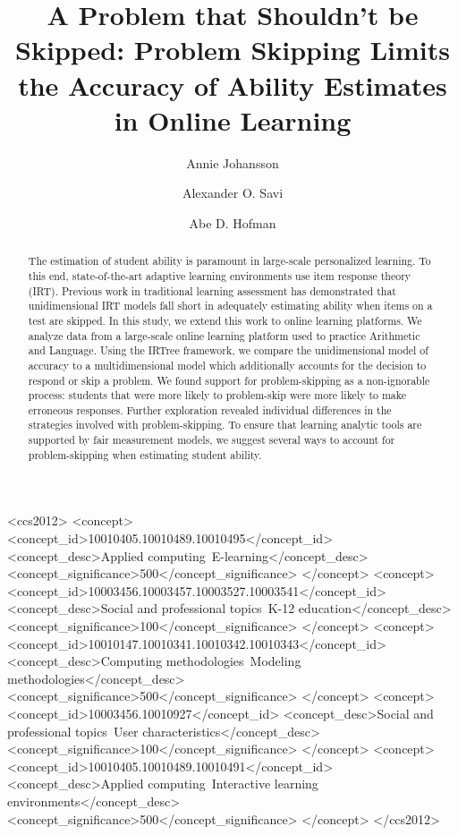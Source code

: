 \documentclass[manuscript]{acmart}
\title[Accounting for Problem-skipping in Online Learning]{A Problem that Shouldn't be Skipped: Problem Skipping Limits the Accuracy of Ability Estimates in Online Learning}
\author{Annie Johansson}
\affiliation{%
  \institution{University of Amsterdam}
  \city{Amsterdam}
  \country{The Netherlands}
}
\author{Alexander O. Savi}
\affiliation{%
  \institution{University of Amsterdam}
  \city{Amsterdam}
  \country{The Netherlands}
}
\author{Abe D. Hofman}
\affiliation{%
  \institution{University of Amsterdam}
  \city{Amsterdam}
  \country{The Netherlands}
}
\affiliation{
  \institution{Prowise Learn}
  \city{Amsterdam}
  \country{The Netherlands}
}
\begin{document}
\begin{abstract}
    The estimation of student ability is paramount in large-scale personalized learning. To this end, state-of-the-art adaptive learning environments use item response theory (IRT). Previous work in traditional learning assessment has demonstrated that unidimensional IRT models fall short in adequately estimating ability when items on a test are skipped. In this study, we extend this work to online learning platforms. We analyze data from a large-scale online learning platform used to practice Arithmetic and Language. Using the IRTree framework, we compare the unidimensional model of accuracy to a multidimensional model which additionally accounts for the decision to respond or skip a problem. We found support for problem-skipping as a non-ignorable process: students that were more likely to problem-skip were more likely to make erroneous responses. Further exploration revealed individual differences in the strategies involved with problem-skipping. To ensure that learning analytic tools are supported by fair measurement models, we suggest several ways to account for problem-skipping when estimating student ability. 
\end{abstract}

\begin{CCSXML}
<ccs2012>
   <concept>
       <concept_id>10010405.10010489.10010495</concept_id>
       <concept_desc>Applied computing~E-learning</concept_desc>
       <concept_significance>500</concept_significance>
       </concept>
   <concept>
       <concept_id>10003456.10003457.10003527.10003541</concept_id>
       <concept_desc>Social and professional topics~K-12 education</concept_desc>
       <concept_significance>100</concept_significance>
       </concept>
   <concept>
       <concept_id>10010147.10010341.10010342.10010343</concept_id>
       <concept_desc>Computing methodologies~Modeling methodologies</concept_desc>
       <concept_significance>500</concept_significance>
       </concept>
   <concept>
       <concept_id>10003456.10010927</concept_id>
       <concept_desc>Social and professional topics~User characteristics</concept_desc>
       <concept_significance>100</concept_significance>
       </concept>
   <concept>
       <concept_id>10010405.10010489.10010491</concept_id>
       <concept_desc>Applied computing~Interactive learning environments</concept_desc>
       <concept_significance>500</concept_significance>
       </concept>
 </ccs2012>
\end{CCSXML}
\end{document}
